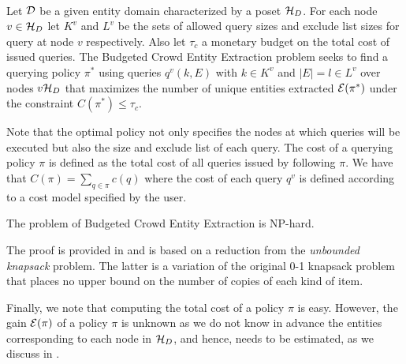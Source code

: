 \begin{problem} \ \\
Let $\mathcal{D}$ be a given entity domain characterized by a poset $\mathcal{H}_D$. For each node $v \in \mathcal{H}_D$ let $K^v$ and $L^v$ be the sets of allowed query sizes and exclude list sizes for query at node $v$ respectively. Also let $\tau_c$ a monetary budget on the total cost of issued queries. The Budgeted Crowd Entity Extraction problem seeks to find a querying policy $\pi^*$ using queries $q^v(k,E)$ with $k \in K^v$ and $|E| = l \in L^v$ over nodes $v \mathcal{H}_D$ that maximizes the number of unique entities extracted $\mathcal{E}(\pi^*)$ under the constraint $C(\pi^*) \leq \tau_c$.
\end{problem}
Note that the optimal policy not only specifies the nodes at which queries will be executed but also the size and exclude list of each query. The cost of a querying policy $\pi$ is defined as the total cost of all queries issued by following $\pi$. We have that $C(\pi) = \sum_{q \in \pi} c(q)$ where the cost of each query $q^v$ is defined according to a cost model specified by the user. 

\begin{theorem}
The problem of Budgeted Crowd Entity Extraction is NP-hard.
\end{theorem}
The proof is provided in  and is based on a reduction from the {\em unbounded knapsack} problem. The latter is a variation of the original 0-1 knapsack problem that places no upper bound on the number of copies of each kind of item.

Finally, we note that computing the total cost of a policy $\pi$ is easy. However, the gain $\mathcal{E}(\pi)$ of a policy $\pi$ is unknown as we do not know in advance the entities corresponding to each node in $\mathcal{H}_D$, and hence, needs to be estimated, as we discuss in . 

